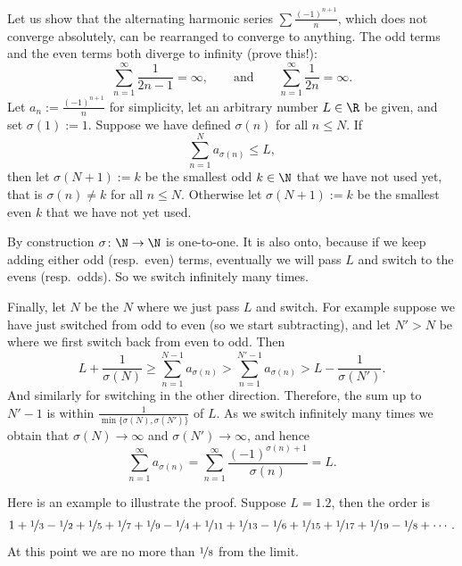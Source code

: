 \documentclass[12pt]{book}
\begin{document}
\begin{example} \label{example:harmonsumanything}
Let us show that the alternating harmonic series $\sum
\frac{{(-1)}^{n+1}}{n}$, which does not converge absolutely, can be
rearranged to converge to anything.
The odd terms and the even terms both diverge to
infinity (prove this!):
\begin{equation*}
\sum_{n=1}^\infty \frac{1}{2n-1} = \infty, \qquad \text{and} \qquad
\sum_{n=1}^\infty \frac{1}{2n} = \infty .
\end{equation*}
Let $a_n := \frac{{(-1)}^{n+1}}{n}$ for simplicity, 
let an arbitrary number $L \in \R$ be given, and set $\sigma(1) := 1$.
Suppose we have
defined $\sigma(n)$ for all $n \leq N$.
If
\begin{equation*}
\sum_{n=1}^N a_{\sigma(n)} \leq L ,
\end{equation*}
then let $\sigma(N+1) := k$ be the smallest odd $k \in \N$
that we have not used yet,
that is $\sigma(n) \not= k$ for all $n \leq N$.
Otherwise let $\sigma(N+1) := k$ 
be the smallest even $k$ that we have not yet used.

By construction $\sigma \colon \N \to \N$ is one-to-one.
It is also onto, because if we keep adding either odd (resp.\ even) terms,
eventually we will pass $L$ and switch
to the evens (resp.\ odds).
So we switch infinitely many times.

Finally, let $N$ be the $N$ where we just pass $L$ and switch.
For example suppose we have just switched from odd to even (so we start
subtracting),
and let $N' > N$ be where we first switch back from even to odd.
Then
\begin{equation*}
L + \frac{1}{\sigma(N)} \geq \sum_{n=1}^{N-1} a_{\sigma(n)}
> \sum_{n=1}^{N'-1} a_{\sigma(n)} > L- \frac{1}{\sigma(N')}.
\end{equation*}
And similarly for switching in the other direction.
Therefore,
the sum up to $N'-1$ is within $\frac{1}{\min \{ \sigma(N), \sigma(N') \}}$
of $L$.
As
we switch infinitely many times we obtain that $\sigma(N) \to \infty$
and $\sigma(N') \to \infty$, and hence
\begin{equation*}
\sum_{n=1}^\infty a_{\sigma(n)} = 
\sum_{n=1}^\infty \frac{{(-1)}^{\sigma(n)+1}}{\sigma(n)} = L .
\end{equation*}

Here is an example to illustrate the proof.
Suppose $L=1.2$, then the order
is
\begin{equation*}
1+\nicefrac{1}{3}-\nicefrac{1}{2}+\nicefrac{1}{5}+\nicefrac{1}{7}+\nicefrac{1}{9}-\nicefrac{1}{4}+\nicefrac{1}{11}+\nicefrac{1}{13}-\nicefrac{1}{6}
+\nicefrac{1}{15}+\nicefrac{1}{17}+\nicefrac{1}{19} - \nicefrac{1}{8} + \cdots .
\end{equation*}
At this point we are no more than $\nicefrac{1}{8}$ from the limit.
\end{example}
\end{document}

